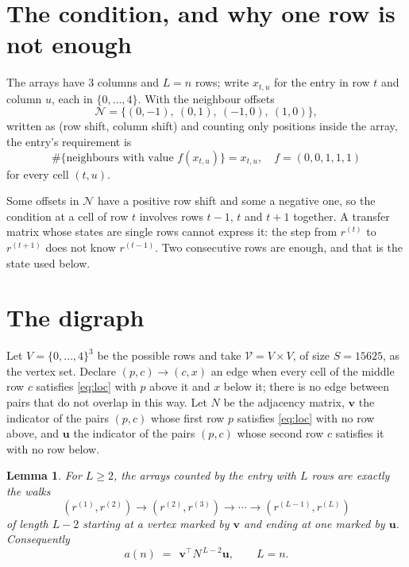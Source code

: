\documentclass[11pt,a4paper]{article}
\theoremstyle{plain}
\newtheorem{lemma}[theorem]{Lemma}
\theoremstyle{definition}
\begin{document}
\section{The condition, and why one row is not enough}

The arrays have $3$ columns and $L=n$ rows; write $x_{t,u}$ for the entry in
row $t$ and column $u$, each in $\{0,\dots,4\}$. With the neighbour offsets
\[
\mathcal N=\{(0,-1),\ (0,1),\ (-1,0),\ (1,0)\},
\]
written as (row shift, column shift) and counting only positions inside the array, the
entry's requirement is
\begin{equation}\label{eq:loc}
\#\{\text{neighbours with value }f(x_{t,u})\}=x_{t,u},\quad f=(0,0,1,1,1)
\end{equation}
for every cell $(t,u)$.

Some offsets in $\mathcal N$ have a positive row shift and some a negative one, so the
condition at a cell of row $t$ involves rows $t-1$, $t$ and $t+1$ together. A transfer
matrix whose states are single rows cannot express it: the step from $r^{(t)}$ to
$r^{(t+1)}$ does not know $r^{(t-1)}$. Two consecutive rows are enough, and that is
the state used below.

\section{The digraph}

Let $V=\{0,\dots,4\}^{3}$ be the possible rows and take
$\mathcal V=V\times V$, of size $S=15625$, as the vertex set. Declare $(p,c)\to(c,x)$ an edge
when every cell of the middle row $c$ satisfies \eqref{eq:loc} with $p$ above it and $x$
below it; there is no edge between pairs that do not overlap in this way. Let $N$ be the
adjacency matrix, $\mathbf{v}$ the indicator of the pairs $(p,c)$ whose first row $p$
satisfies \eqref{eq:loc} with no row above, and $\mathbf{u}$ the indicator of
the pairs $(p,c)$ whose second row $c$ satisfies it with no row below.

\begin{lemma}\label{lem:walk}
For $L\ge2$, the arrays counted by the entry with $L$ rows are exactly the walks
\[
(r^{(1)},r^{(2)})\to(r^{(2)},r^{(3)})\to\cdots\to(r^{(L-1)},r^{(L)})
\]
of length $L-2$ starting at a vertex marked by $\mathbf{v}$ and ending at one marked by
$\mathbf{u}$. Consequently
\[
a(n)\;=\;\,\mathbf{v}^{\!\top}N^{\,L-2}\mathbf{u},\qquad L=n .
\]
\end{lemma}
\end{document}

